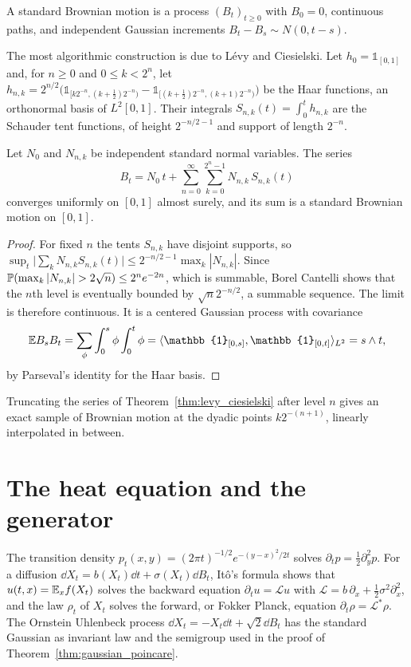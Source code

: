 \begin{definition}
A standard Brownian motion is a process $(B_t)_{t\geq0}$ with $B_0 = 0$, continuous paths, and independent Gaussian increments $B_t - B_s\sim N(0,t-s)$.
\end{definition}

The most algorithmic construction is due to L\'evy and Ciesielski. Let $h_{0}=\mathbb{1}_{[0,1]}$ and, for $n\geq0$ and $0\leq k<2^n$, let $h_{n,k} = 2^{n/2}\big(\mathbb{1}_{[k2^{-n},(k+\frac12)2^{-n})} - \mathbb{1}_{[(k+\frac12)2^{-n},(k+1)2^{-n})}\big)$ be the Haar functions, an orthonormal basis of $L^2[0,1]$. Their integrals $S_{n,k}(t) = \int_0^t h_{n,k}$ are the Schauder tent functions, of height $2^{-n/2-1}$ and support of length $2^{-n}$.

\begin{theorem}
\label{thm:levy_ciesielski}
Let $N_0$ and $N_{n,k}$ be independent standard normal variables. The series
\[
B_t = N_0\,t + \sum_{n=0}^\infty\sum_{k=0}^{2^n-1} N_{n,k}\,S_{n,k}(t)
\]
converges uniformly on $[0,1]$ almost surely, and its sum is a standard Brownian motion on $[0,1]$.
\end{theorem}

\begin{proof}
For fixed $n$ the tents $S_{n,k}$ have disjoint supports, so $\sup_t\big|\sum_k N_{n,k}S_{n,k}(t)\big|\leq 2^{-n/2-1}\max_k|N_{n,k}|$. Since $\P(\max_k|N_{n,k}|>2\sqrt{n})\leq 2^n e^{-2n}$, which is summable, Borel Cantelli shows that the $n$th level is eventually bounded by $\sqrt{n}2^{-n/2}$, a summable sequence. The limit is therefore continuous. It is a centered Gaussian process with covariance
\[
\E B_sB_t = \sum_{\phi}\int_0^s\phi\int_0^t\phi = \langle\mathbb{1}_{[0,s]},\mathbb{1}_{[0,t]}\rangle_{L^2} = s\wedge t,
\]
by Parseval's identity for the Haar basis.
\end{proof}

Truncating the series of Theorem~\ref{thm:levy_ciesielski} after level $n$ gives an exact sample of Brownian motion at the dyadic points $k2^{-(n+1)}$, linearly interpolated in between.

\section{The heat equation and the generator}

The transition density $p_t(x,y) = (2\pi t)^{-1/2}e^{-(y-x)^2/2t}$ solves $\partial_t p = \frac12\partial_y^2 p$. For a diffusion $\dd X_t = b(X_t)\dd t + \sigma(X_t)\dd B_t$, It\^o's formula shows that $u(t,x) = \mathbb{E}_x f(X_t)$ solves the backward equation $\partial_t u = \mathcal{L}u$ with $\mathcal{L} = b\,\partial_x + \frac12\sigma^2\partial_x^2$, and the law $\rho_t$ of $X_t$ solves the forward, or Fokker Planck, equation $\partial_t\rho = \mathcal{L}^*\rho$. The Ornstein Uhlenbeck process $\dd X_t = -X_t\dd t+\sqrt2\dd B_t$ has the standard Gaussian as invariant law and the semigroup used in the proof of Theorem~\ref{thm:gaussian_poincare}.

